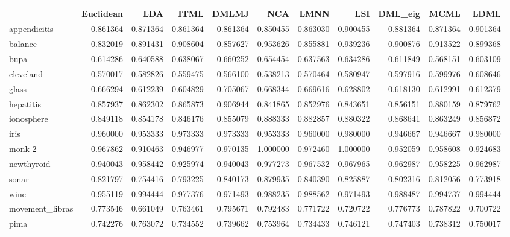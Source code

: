 \begin{tabular}{lrrrrrrrrrr}
\toprule
{} &  Euclidean &       LDA &      ITML &     DMLMJ &       NCA &      LMNN &       LSI &   DML\_eig &      MCML &      LDML \\
\midrule
appendicitis    &   0.861364 &  0.871364 &  0.861364 &  0.861364 &  0.850455 &  0.863030 &  0.900455 &  0.881364 &  0.871364 &  0.901364 \\
balance         &   0.832019 &  0.891431 &  0.908604 &  0.857627 &  0.953626 &  0.855881 &  0.939236 &  0.900876 &  0.913522 &  0.899368 \\
bupa            &   0.614286 &  0.640588 &  0.638067 &  0.660252 &  0.654454 &  0.637563 &  0.634286 &  0.611849 &  0.568151 &  0.603109 \\
cleveland       &   0.570017 &  0.582826 &  0.559475 &  0.566100 &  0.538213 &  0.570464 &  0.580947 &  0.597916 &  0.599976 &  0.608646 \\
glass           &   0.666294 &  0.612239 &  0.604829 &  0.705067 &  0.668344 &  0.669616 &  0.628802 &  0.618130 &  0.612991 &  0.612379 \\
hepatitis       &   0.857937 &  0.862302 &  0.865873 &  0.906944 &  0.841865 &  0.852976 &  0.843651 &  0.856151 &  0.880159 &  0.879762 \\
ionosphere      &   0.849118 &  0.854178 &  0.846176 &  0.855079 &  0.888333 &  0.882857 &  0.880322 &  0.868641 &  0.863249 &  0.856872 \\
iris            &   0.960000 &  0.953333 &  0.973333 &  0.973333 &  0.953333 &  0.960000 &  0.980000 &  0.946667 &  0.946667 &  0.980000 \\
monk-2          &   0.967862 &  0.910463 &  0.946977 &  0.970135 &  1.000000 &  0.972460 &  1.000000 &  0.952059 &  0.958608 &  0.924683 \\
newthyroid      &   0.940043 &  0.958442 &  0.925974 &  0.940043 &  0.977273 &  0.967532 &  0.967965 &  0.962987 &  0.958225 &  0.962987 \\
sonar           &   0.821797 &  0.754416 &  0.793225 &  0.840173 &  0.879935 &  0.840390 &  0.825887 &  0.802316 &  0.812056 &  0.773918 \\
wine            &   0.955119 &  0.994444 &  0.977376 &  0.971493 &  0.988235 &  0.988562 &  0.971493 &  0.988487 &  0.994737 &  0.994444 \\
movement\_libras &   0.773546 &  0.661049 &  0.763461 &  0.795671 &  0.792483 &  0.771722 &  0.720722 &  0.776773 &  0.787822 &  0.700722 \\
pima            &   0.742276 &  0.763072 &  0.734552 &  0.739662 &  0.753964 &  0.734433 &  0.746121 &  0.747403 &  0.738312 &  0.750017 \\

\end{tabular}
